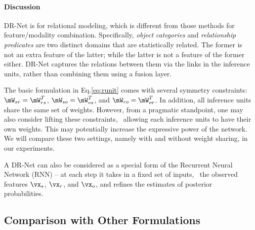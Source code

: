 \documentclass[10pt,twocolumn,letterpaper]{article}
\begin{document}
\paragraph{Discussion}

DR-Net is for relational modeling,
which is different from those methods for feature/modality combination.
Specifically, \emph{object categories} and \emph{relationship predicates} are
two distinct domains that are statistically related. 
The former is not an extra feature of the latter; while the latter is 
not a feature of the former either. 
DR-Net captures the relations between them via the links in the 
inference units, rather than combining them using a fusion layer. 

The basic formulation in Eq.\ref{eq:runit} comes with several symmetry constraints: 
$\mW_{sr} = \mW_{rs}^T$, $\mW_{so} = \mW_{os}^T$, and $\mW_{ro} = \mW_{or}^T$. 
In addition, all inference units share the same set of weights. 
%
However, from a pragmatic standpoint, one may also consider lifting these constraints,
\eg~allowing each inference units to have their own weights. 
This may potentially increase the expressive power of the network.
We will compare these two settings, namely with and without weight sharing, in our experiments. 

A DR-Net can also be considered as a special form of the Recurrent Neural Network (RNN)
-- at each step it takes in a fixed set of inputs, 
\ie~the observed features $\vx_s$, $\vx_r$, and $\vx_o$, and
refines the estimates of posterior probabilities.

\subsection{Comparison with Other Formulations}%
\end{document}
